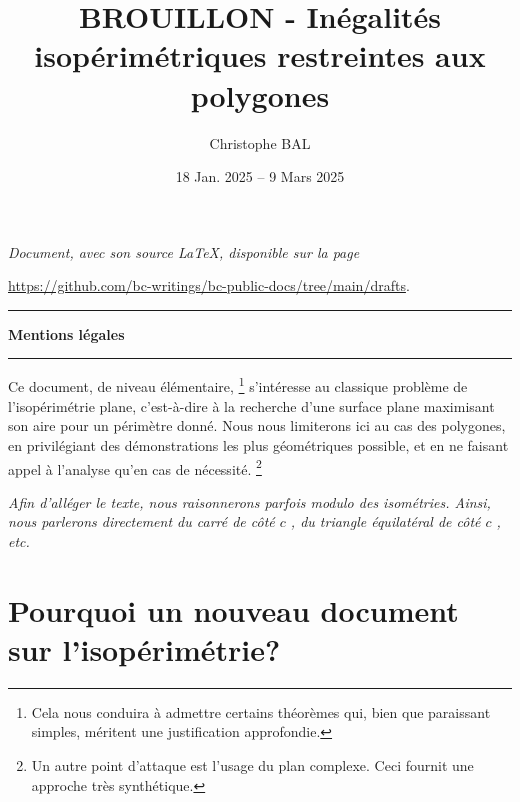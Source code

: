 \documentclass[12pt]{amsart}
\begin{document}
\title{BROUILLON - Inégalités isopérimétriques restreintes aux polygones}
\author{Christophe BAL}
\date{18 Jan. 2025 -- 9 Mars 2025}

\maketitle

\begin{center}
	\itshape
	Document, avec son source \LaTeX, disponible sur la page

	\url{https://github.com/bc-writings/bc-public-docs/tree/main/drafts}.
\end{center}


\bigskip


\begin{center}
	\hrule\vspace{.3em}
	{
		\fontsize{1.35em}{1em}\selectfont
		\textbf{Mentions \og légales \fg}
	}

	\vspace{0.45em}
	\doclicenseThis
	\hrule
\end{center}



\setcounter{tocdepth}{2}
\tableofcontents




\newpage

Ce document, de niveau élémentaire,%
\footnote{
    Cela nous conduira à admettre certains théorèmes qui, bien que paraissant simples, méritent une justification approfondie.
}
s'intéresse au classique problème de l'isopérimétrie plane, c'est-à-dire à la recherche d'une surface plane maximisant son aire pour un périmètre donné.
Nous nous limiterons ici au cas des polygones, en privilégiant des démonstrations les plus géométriques possible, et en ne faisant appel à l'analyse qu'en cas de nécessité.%
\footnote{
    Un autre point d'attaque est l'usage du plan complexe. Ceci fournit une approche très synthétique.
}


\begin{tcolorbox}
    \itshape\small
    Afin d'alléger le texte, nous raisonnerons parfois modulo des isométries. Ainsi, nous parlerons directement du \og carré de côté \( c \) \fg, du \og triangle équilatéral de côté \( c \) \fg, etc.
\end{tcolorbox}




\section{Pourquoi un  nouveau document sur l'isopérimétrie?}

\end{document}
